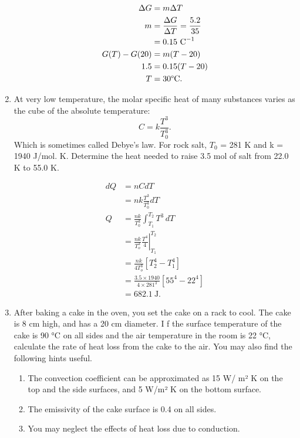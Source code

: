 \documentclass{zc-ust-hw}
\begin{document}
\begin{enumerate}
    \begin{sol}
      \begin{align}
        \Delta G&=m\Delta T \\
        m&= \frac{\Delta G}{\Delta T} = \frac{5.2}{35} \\
         &= 0.15 \text{ C}^{-1} \\
        G(T)-G(20)&=m(T-20) \\
        1.5&=0.15(T-20) \\
        T&=30\text{\textdegree C}
      .\end{align}
    \end{sol}

  \item At very low temperature, the molar specific heat of many substances
    varies as the cube of the absolute temperature: 
    \[
      C=k \frac{T^3}{T_{0}^3}
    .\] 
    Which is sometimes called Debye’s law. For rock salt, \( T_{0} \) = 281 K and k =
    1940 J/mol. K. Determine the heat needed to raise 3.5 mol of salt from 22.0
    K to 55.0 K.  
    \begin{sol}
      \begin{align}
        dQ &= nCdT \\
        &= nk \frac{T^3}{T_{0}^3}dT \\
        Q &= \frac{nk}{T_{0}^3 }\int_{T_{1}}^{T_{2}}T^3 \,dT  \\
        &=\left.\frac{n k}{T_o^3} \frac{T^4}{4}\right|_{T_1} ^{T_2} \\
        &=\frac{n k}{4 T_o^3}\left[T_2^4-T_1^4\right] \\
        &=\frac{3.5 \times 1940}{4 \times 281^3}\left[55^4-22^4\right] \\
        &=682.1 \mathrm{~J}
      .\end{align}
    \end{sol}

    \newpage
    
  \item After baking a cake in the oven, you set the cake on a rack to cool.
    The cake is 8 cm high, and has a 20 cm diameter. I f the surface
    temperature of the cake is 90 °C on all sides and the air temperature in
    the room is 22 °C, calculate the rate of heat loss from the cake to the
    air. You may also find the following hints useful.
    \begin{enumerate}
      \item The convection coefficient can be approximated as 15 W/ m² K on the
        top and the side surfaces, and 5 W/m² K on the bottom surface. 
      \item The emissivity of the cake surface is 0.4 on all sides. 
      \item You may neglect the effects of heat loss due to conduction. 
    \end{enumerate}
    

\end{enumerate}
\end{document}
